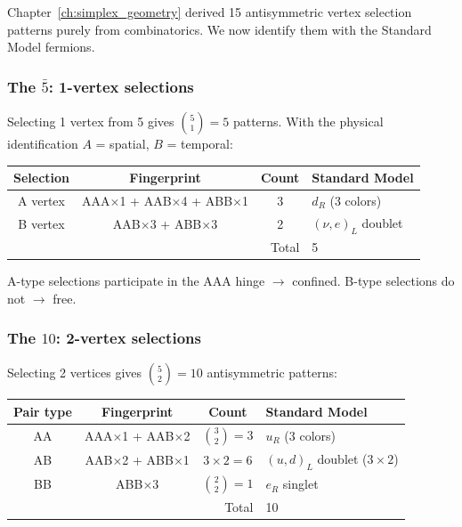 Chapter~\ref{ch:simplex_geometry} derived 15 antisymmetric vertex selection patterns purely from combinatorics. We now identify them with the Standard Model fermions.

\subsubsection{The $\bar{5}$: 1-vertex selections}

Selecting 1 vertex from 5 gives $\binom{5}{1} = 5$ patterns. With the physical identification $A$ = spatial, $B$ = temporal:

\begin{center}
\begin{tabular}{cccl}
\hline
Selection & Fingerprint & Count & Standard Model \\
\hline
A vertex & AAA$\times$1 + AAB$\times$4 + ABB$\times$1 & 3 & $d_R$ (3 colors) \\
B vertex & AAB$\times$3 + ABB$\times$3 & 2 & $(\nu, e)_L$ doublet \\
\hline
\multicolumn{3}{r}{Total} & 5 \\
\hline
\end{tabular}
\end{center}

A-type selections participate in the AAA hinge $\to$ confined. B-type selections do not $\to$ free.

\subsubsection{The $10$: 2-vertex selections}

Selecting 2 vertices gives $\binom{5}{2} = 10$ antisymmetric patterns:

\begin{center}
\begin{tabular}{cccl}
\hline
Pair type & Fingerprint & Count & Standard Model \\
\hline
AA & AAA$\times$1 + AAB$\times$2 & $\binom{3}{2} = 3$ & $u_R$ (3 colors) \\
AB & AAB$\times$2 + ABB$\times$1 & $3 \times 2 = 6$ & $(u, d)_L$ doublet ($3 \times 2$) \\
BB & ABB$\times$3 & $\binom{2}{2} = 1$ & $e_R$ singlet \\
\hline
\multicolumn{3}{r}{Total} & 10 \\
\hline
\end{tabular}
\end{center}


